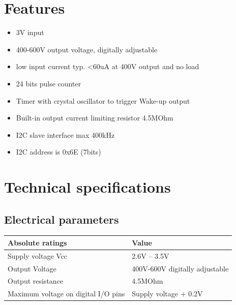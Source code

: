 \documentclass[a4paper]{article}
\newcommand\liststyleLi{%
\renewcommand\labelitemi{{\textbullet}}
\renewcommand\labelitemii{${\circ}$}
\renewcommand\labelitemiii{${\blacksquare}$}
\renewcommand\labelitemiv{{\textbullet}}
}
\begin{document}
\section[]{ }
\section[Features]{ Features}
\hypertarget{RefHeadingToc2781383566216}{}\liststyleLi
\begin{itemize}
\item {
3V input}
\item {
400-600V output voltage, digitally adjustable}
\item {
low input current typ. {\textless}60uA at 400V output and no load}
\item {
24 bits pulse counter}
\item {
Timer with crystal oscillator to trigger Wake{}-up output}
\item {
Built-in output current limiting resistor 4.5MOhm}
\item {
I2C slave interface max 400kHz}
\item {
I2C address is 0x6E (7bits)}
\end{itemize}
\section[]{ }
\clearpage\section[Technical specifications]{ Technical specifications}
\hypertarget{RefHeadingToc1331383566216}{}\subsection[Electrical parameters]{ Electrical
parameters}
\hypertarget{RefHeadingToc2801383566216}{}\begin{center}
\tablefirsthead{}
\tablehead{}
\tabletail{}
\tablelasttail{}
\begin{supertabular}{|m{4.21016in}|m{2.32756in}|}
\hline
{\bfseries Absolute ratings} &
{\bfseries Value}\\\hline
{ Supply voltage Vcc} &
{ 2.6V -- 3.5V}\\\hline
{ Output Voltage} &
{ 400V-600V digitally adjustable}\\\hline
{ Output resistance} &
{ 4.5MOhm}\\\hline
{ Maximum voltage on digital I/O pins} &
{ Supply voltage + 0.2V}\\\hline
\end{supertabular}
\end{center}
\end{document}
